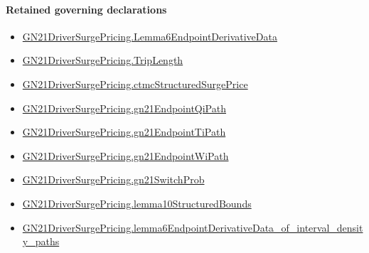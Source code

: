 \documentclass[10pt]{article}
\begin{document}
\paragraph{Retained governing declarations}
\begin{itemize}\raggedright
\item \hyperlink{paper-prerequisite-c788598c55db0e43}{GN21\allowbreak{}Driver\allowbreak{}Surge\allowbreak{}Pricing.\allowbreak{}Lemma6\allowbreak{}Endpoint\allowbreak{}Derivative\allowbreak{}Data}
\item \hyperlink{governing-declaration-a616c143f22cf2bc}{GN21\allowbreak{}Driver\allowbreak{}Surge\allowbreak{}Pricing.\allowbreak{}Trip\allowbreak{}Length}
\item \hyperlink{governing-declaration-15a2877cbcc7c912}{GN21\allowbreak{}Driver\allowbreak{}Surge\allowbreak{}Pricing.\allowbreak{}ctmc\allowbreak{}Structured\allowbreak{}Surge\allowbreak{}Price}
\item \hyperlink{governing-declaration-22bcf97296622d31}{GN21\allowbreak{}Driver\allowbreak{}Surge\allowbreak{}Pricing.\allowbreak{}gn21\allowbreak{}Endpoint\allowbreak{}Qi\allowbreak{}Path}
\item \hyperlink{governing-declaration-55d93f96ff329745}{GN21\allowbreak{}Driver\allowbreak{}Surge\allowbreak{}Pricing.\allowbreak{}gn21\allowbreak{}Endpoint\allowbreak{}Ti\allowbreak{}Path}
\item \hyperlink{governing-declaration-dceaddfe91d03dd1}{GN21\allowbreak{}Driver\allowbreak{}Surge\allowbreak{}Pricing.\allowbreak{}gn21\allowbreak{}Endpoint\allowbreak{}Wi\allowbreak{}Path}
\item \hyperlink{governing-declaration-2506e20884d6eb69}{GN21\allowbreak{}Driver\allowbreak{}Surge\allowbreak{}Pricing.\allowbreak{}gn21\allowbreak{}Switch\allowbreak{}Prob}
\item \hyperlink{governing-declaration-7ae58d34ee3bfa65}{GN21\allowbreak{}Driver\allowbreak{}Surge\allowbreak{}Pricing.\allowbreak{}lemma10\allowbreak{}Structured\allowbreak{}Bounds}
\item \hyperlink{governing-declaration-ba9baa90aba5a30b}{GN21\allowbreak{}Driver\allowbreak{}Surge\allowbreak{}Pricing.\allowbreak{}lemma6\allowbreak{}Endpoint\allowbreak{}Derivative\allowbreak{}Data\_\allowbreak{}of\_\allowbreak{}interval\_\allowbreak{}density\_\allowbreak{}paths}
\end{itemize}
\end{document}
